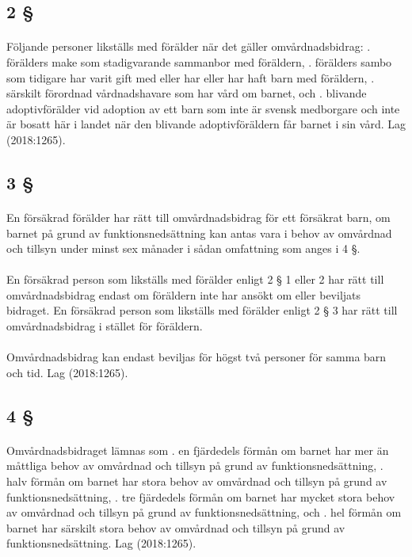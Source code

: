 \documentclass[a4paper,notitlepage,openany,10pt]{book}
\begin{document}
\subsection*{2 §}
\paragraph*{}
Följande personer likställs med förälder när det gäller omvårdnadsbidrag:
. förälders make som stadigvarande sammanbor med föräldern,
. förälders sambo som tidigare har varit gift med eller har eller har haft barn med föräldern,
. särskilt förordnad vårdnadshavare som har vård om barnet, och
. blivande adoptivförälder vid adoption av ett barn som inte är svensk medborgare och inte är bosatt här i landet när den blivande adoptivföräldern får barnet i sin vård.
Lag (2018:1265).
\subsection*{3 §}
\paragraph*{}
En försäkrad förälder har rätt till omvårdnadsbidrag för ett försäkrat barn, om barnet på grund av funktionsnedsättning kan antas vara i behov av omvårdnad och tillsyn under minst sex månader i sådan omfattning som anges i 4 §.
\paragraph*{}
En försäkrad person som likställs med förälder enligt 2 § 1 eller 2 har rätt till omvårdnadsbidrag endast om föräldern inte har ansökt om eller beviljats bidraget. En försäkrad person som likställs med förälder enligt 2 § 3 har rätt till omvårdnadsbidrag i stället för föräldern.
\paragraph*{}
Omvårdnadsbidrag kan endast beviljas för högst två personer för samma barn och tid.
Lag (2018:1265).
\subsection*{4 §}
\paragraph*{}
Omvårdnadsbidraget lämnas som
. en fjärdedels förmån om barnet har mer än måttliga behov av omvårdnad och tillsyn på grund av funktionsnedsättning,
. halv förmån om barnet har stora behov av omvårdnad och tillsyn på grund av funktionsnedsättning,
. tre fjärdedels förmån om barnet har mycket stora behov av omvårdnad och tillsyn på grund av funktionsnedsättning, och
. hel förmån om barnet har särskilt stora behov av omvårdnad och tillsyn på grund av funktionsnedsättning.
Lag (2018:1265).
\end{document}
